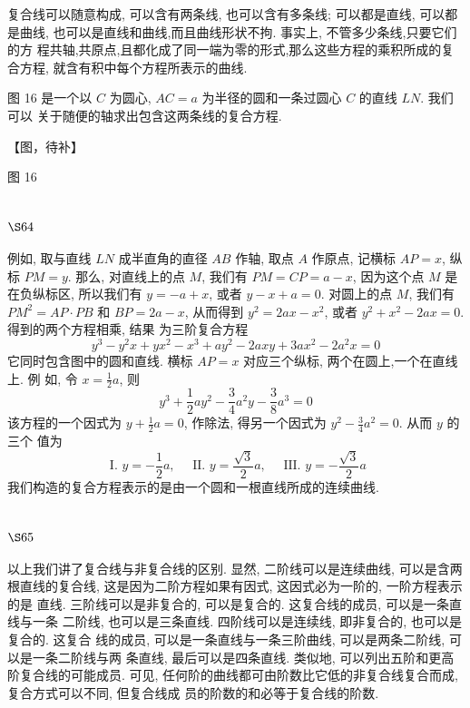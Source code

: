 复合线可以随意构成, 可以含有两条线, 也可以含有多条线; 可以都是直线, 可以都 是曲线, 也可以是直线和曲线,而且曲线形状不拘. 事实上, 不管多少条线,只要它们的方 程共轴,共原点,且都化成了同一端为零的形式,那么这些方程的乘积所成的复合方程, 就含有积中每个方程所表示的曲线.

图 16 是一个以 $C$ 为圆心, $A C=a$ 为半径的圆和一条过圆心 $C$ 的直线 $L N$. 我们可以 关于随便的轴求出包含这两条线的复合方程.


【图，待补】

图 16

\section{$\S 64$}

例如, 取与直线 $L N$ 成半直角的直径 $A B$ 作轴, 取点 $A$ 作原点, 记横标 $A P=x$, 纵标 $P M=y$. 那么, 对直线上的点 $M$, 我们有 $P M=C P=a-x$, 因为这个点 $M$ 是在负纵标区, 所以我们有 $y=-a+x$, 或者 $y-x+a=0$. 对圆上的点 $M$, 我们有 $P M^{2}=A P \cdot P B$ 和 $B P=2 a-x$, 从而得到 $y^{2}=2 a x-x^{2}$, 或者 $y^{2}+x^{2}-2 a x=0$. 得到的两个方程相乘, 结果 为三阶复合方程
\[
y^{3}-y^{2} x+y x^{2}-x^{3}+a y^{2}-2 a x y+3 a x^{2}-2 a^{2} x=0
\]
它同时包含图中的圆和直线. 横标 $A P=x$ 对应三个纵标, 两个在圆上,一个在直线上. 例 如, 令 $x=\frac{1}{2} a$, 则
\[
y^{3}+\frac{1}{2} a y^{2}-\frac{3}{4} a^{2} y-\frac{3}{8} a^{3}=0
\]
该方程的一个因式为 $y+\frac{1}{2} a=0$, 作除法, 得另一个因式为 $y^{2}-\frac{3}{4} a^{2}=0$. 从而 $y$ 的三个 值为
\[
\text { I. } y=-\frac{1}{2} a, \quad \text { II. } y=\frac{\sqrt{3}}{2} a, \quad \text { III. } y=-\frac{\sqrt{3}}{2} a
\]
我们构造的复合方程表示的是由一个圆和一根直线所成的连续曲线.

\section{$\S 65$}

以上我们讲了复合线与非复合线的区别. 显然, 二阶线可以是连续曲线, 可以是含两 根直线的复合线, 这是因为二阶方程如果有因式, 这因式必为一阶的, 一阶方程表示的是 直线. 三阶线可以是非复合的, 可以是复合的. 这复合线的成员, 可以是一条直线与一条 二阶线, 也可以是三条直线. 四阶线可以是连续线, 即非复合的, 也可以是复合的. 这复合 线的成员, 可以是一条直线与一条三阶曲线, 可以是两条二阶线, 可以是一条二阶线与两 条直线, 最后可以是四条直线. 类似地, 可以列出五阶和更高阶复合线的可能成员. 可见, 任何阶的曲线都可由阶数比它低的非复合线复合而成, 复合方式可以不同, 但复合线成 员的阶数的和必等于复合线的阶数. 

